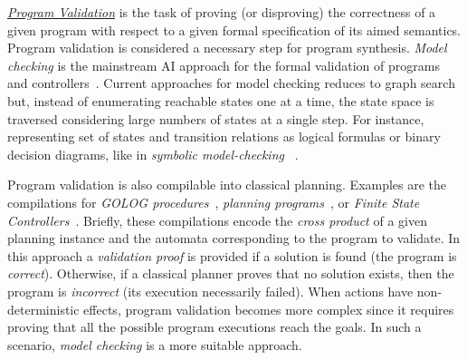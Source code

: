 \documentclass[10pt,a4paper]{paper}
\begin{document}
{\underline{\em Program Validation}} is the task of proving (or disproving) the correctness of a given program with respect to a given formal specification of its aimed semantics. Program validation is considered a necessary step for program synthesis. {\em Model checking} is the mainstream AI approach for the formal validation of programs and controllers~\cite{clarke1999model}. Current approaches for model checking reduces to graph search but, instead of enumerating reachable states one at a time, the state space is traversed considering large numbers of states at a single step. For instance, representing set of states and transition relations as logical formulas or binary decision diagrams, like in {\em symbolic model-checking} ~\cite{mcmillan1993symbolic}.

Program validation is also compilable into classical planning. Examples are the compilations for {\em {\sc GOLOG} procedures}~\cite{baier2007exploiting}, {\em planning programs}~\cite{segovia:programs:AIJ19}, or {\em Finite State Controllers}~\cite{Geffner:FSM:AAAI10,sergio:aprograming:ijcai16,segovia:FSC:JAIR2018}. Briefly, these compilations encode the {\em cross product} of a given planning instance and the automata corresponding to the program to validate. In this approach a {\em validation proof} is provided if a solution is found (the program is {\em correct}). Otherwise, if a classical planner proves that no solution exists, then the program is {\em incorrect} (its execution necessarily failed). When actions have non-deterministic effects, program validation becomes more complex since it requires proving that all the possible program executions reach the goals. In such a scenario, {\em model checking} is a more suitable approach.
\newpage
\end{document}
